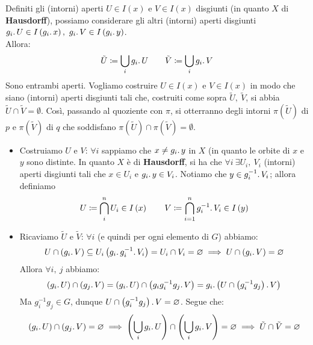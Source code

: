 \begin{demonstration}
\begin{enumerate}[label=\Roman*]
Definiti gli (intorni) aperti $U\in I\left(x\right)$ e $V\in I\left(x\right)$ disgiunti (in quanto $X$ di \textbf{Hausdorff}), possiamo considerare gli altri (intorni) aperti disgiunti $g_i\ldotp U\in I\left(g_i\ldotp x\right),\ g_i\ldotp V\in I\left(g_i\ldotp y\right)$.\\
Allora:
\begin{equation}
\tilde{U}\coloneqq \union_{i}g_i\ldotp U\qquad \tilde{V}\coloneqq \union_{i}g_i\ldotp V
\end{equation}
Sono entrambi aperti. Vogliamo costruire $U\in I\left(x\right)$ e $V\in I\left(x\right)$ in modo che siano (intorni) aperti disgiunti tali che, costruiti come sopra $\tilde{U},\ \tilde{V}$, si abbia $\tilde{U}\cap \tilde{V}=\emptyset$. Così, passando al quoziente con $\pi$, si otterranno degli intorni $\pi\left(\tilde{U}\right)$ di $p$ e $\pi\left(\tilde{V}\right)$ di $q$ che soddisfano $\pi\left(\tilde{U}\right)\cap \pi\left(\tilde{V}\right)=\emptyset$.\\
\begin{itemize}
\item Costruiamo $U$ e $V$: $\forall i$ sappiamo che $x\neq g_i\ldotp y$ in $X$ (in quanto le orbite di $x$ e $y$ sono distinte. In quanto $X$ è di \textbf{Hausdorff}, si ha che $\forall i\ \exists U_i,\ V_i$ (intorni) aperti disgiunti tali che $x\in U_i$ e $g_i\ldotp y\in V_i$. Notiamo che $y\in g_i^{-1}\ldotp V_i$; allora definiamo
\begin{equation*}
U\coloneqq \inter_{i}^{n}U_i\in I\left(x\right)\qquad V\coloneqq \inter_{i=1}^{n}g_i^{-1}\ldotp V_i\in I\left(y\right)
\end{equation*}
\item Ricaviamo $\tilde{U}$ e $\tilde{V}$: $\forall i$ (e quindi per ogni elemento di $G$) abbiamo:
\begin{equation*}
U\cap \left(g_i\ldotp V\right)\subseteq U_i\left(g_i\ldotp g_i^{-1}\ldotp V_i\right)=U_i\cap V_i=\emptyset\implies U\cap \left(g_i\ldotp V\right)=\emptyset
\end{equation*}
Allora $\forall i,\ j$ abbiamo:
\begin{equation*}
	\left(g_i\ldotp U\right)\cap \left(g_j\ldotp V\right)=\left(g_i\ldotp U\right)\cap \left(g_ig_i^{-1}g_j\ldotp V\right)= g_i\ldotp \left(U\cap \left(g_i^{-1}g_j\right)\ldotp V\right)
\end{equation*}
Ma $g_i^{-1}g_j \in G$, dunque $U\cap \left(g_i^{-1}g_j\right)\ldotp V=\emptyset$. Segue che:
\begin{equation*}
	\left(g_i\ldotp U\right)\cap \left(g_j\ldotp V\right)=\emptyset\implies
	\left(\union_{i}g_i\ldotp U\right)\cap \left(\union_{i}g_i\ldotp V\right)=\emptyset\implies \tilde{U}\cap \tilde{V}=\emptyset
\end{equation*}	
\end{itemize}
\end{enumerate}
\end{demonstration}
